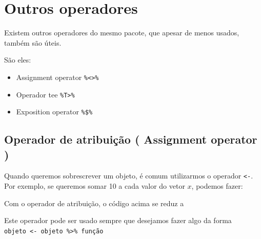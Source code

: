 \documentclass[]{book}
\newenvironment{Shaded}{\begin{snugshade}}{\end{snugshade}}
\newcommand{\CommentTok}[1]{\textcolor[rgb]{0.56,0.35,0.01}{\textit{#1}}}
\newcommand{\DecValTok}[1]{\textcolor[rgb]{0.00,0.00,0.81}{#1}}
\newcommand{\KeywordTok}[1]{\textcolor[rgb]{0.13,0.29,0.53}{\textbf{#1}}}
\newcommand{\NormalTok}[1]{#1}
\newcommand{\OperatorTok}[1]{\textcolor[rgb]{0.81,0.36,0.00}{\textbf{#1}}}
\newcommand{\StringTok}[1]{\textcolor[rgb]{0.31,0.60,0.02}{#1}}
\begin{document}
\hypertarget{outros-operadores}{%
\section{Outros operadores}\label{outros-operadores}}

Existem outros operadores do mesmo pacote, que apesar de menos usados, também são úteis.

São eles:

\begin{itemize}
\item
  Assignment operator \texttt{\%\textless{}\textgreater{}\%}
\item
  Operador tee \texttt{\%T\textgreater{}\%}
\item
  Exposition operator \texttt{\%\$\%}
\end{itemize}

\hypertarget{operador-de-atribuiuxe7uxe3o-assignment-operator}{%
\subsection{Operador de atribuição ( Assignment operator )}\label{operador-de-atribuiuxe7uxe3o-assignment-operator}}

Quando queremos sobrescrever um objeto, é comum utilizarmos o operador \texttt{\textless{}-}. Por exemplo, se queremos somar 10 a cada valor do vetor \(x\), podemos fazer:

\begin{Shaded}
\end{Shaded}

Com o operador de atribuição, o código acima se reduz a

\begin{Shaded}
\end{Shaded}

Este operador pode ser usado sempre que desejamos fazer algo da forma \texttt{objeto\ \textless{}-\ objeto\ \%\textgreater{}\%\ função}
\end{document}
